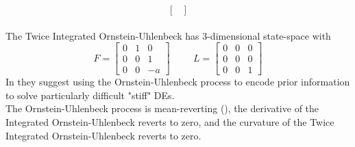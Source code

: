 {$$\begin{bmatrix}
    \end{bmatrix}$$
    \\ The Twice Integrated Ornstein-Uhlenbeck has 3-dimensional state-space with $$F=\begin{bmatrix}
        0 & 1 & 0 \\ 0 & 0 & 1 \\ 0 & 0 & -a
    \end{bmatrix} \hspace{1cm} L=\begin{bmatrix}
        0 & 0 & 0 \\ 0 & 0 & 0 \\ 0 & 0 & 1
    \end{bmatrix}$$
    In \cite{exponential_probabilistic} they suggest using the Ornstein-Uhlenbeck process to encode prior information to solve particularly difficult "stiff" DEs.\\
    The Ornstein-Uhlenbeck process is mean-reverting (\cite{probnum}), the derivative of the Integrated Ornstein-Uhlenbeck reverts to zero, and the curvature of the Twice Integrated Ornstein-Uhlenbeck reverts to zero.
}


